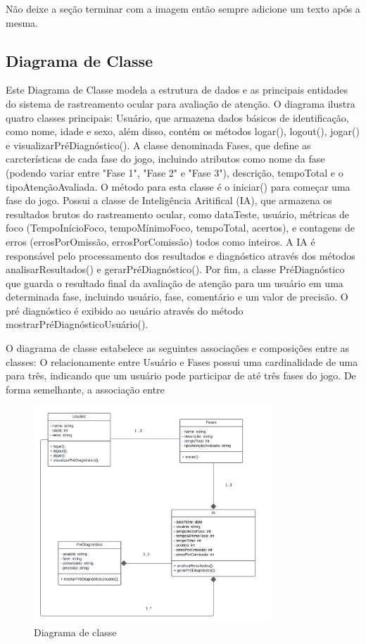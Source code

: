 \documentclass[
  a4paper,%
  12pt,%
  english,%
  brazilian,%
]{article}
\begin{document}
    Não deixe a seção terminar com a imagem então sempre adicione um texto após a mesma.
    
    \subsection*{Diagrama de Classe}

    Este Diagrama de Classe modela a estrutura de dados e as principais entidades do sistema de rastreamento ocular para avaliação de atenção.
    O diagrama ilustra quatro classes principais: Usuário, que armazena dados básicos de identificação, como nome, idade e sexo, além disso, contém os métodos logar(), logout(), jogar() e visualizarPréDiagnóstico(). A classe denominada Fases, que define as carcterísticas de cada fase do jogo, incluindo atributos como nome da fase (podendo variar entre "Fase 1", "Fase 2" e "Fase 3"), descrição, tempoTotal e o tipoAtençãoAvaliada. O método para esta classe é o iniciar() para começar uma fase do jogo. Possui a classe de Inteligência Aritifical (IA), que armazena os resultados brutos do rastreamento ocular, como dataTeste, usuário, métricas de foco (TempoInícioFoco, tempoMínimoFoco, tempoTotal, acertos), e contagens de erros (errosPorOmissão, errosPorComissão) todos como inteiros. A IA é responsável pelo processamento dos resultados e diagnóstico através dos métodos analisarResultados() e gerarPréDiagnóstico(). Por fim, a classe PréDiagnóstico que guarda o resultado final da avaliação de atenção para um usuário em uma determinada fase, incluindo usuário, fase, comentário e um valor de precisão. O pré diagnóstico é exibido ao usuário através do método mostrarPréDiagnósticoUsuário().

    O diagrama de classe estabelece as seguintes associações e composições entre as classes: O relacionamente entre Usuário e Fases possui uma cardinalidade de uma para três, indicando que um usuário pode participar de até três fases do jogo. De forma semelhante, a associação entre 

    \begin{figure}[H]
\centering
\caption{Diagrama de classe}%
\label{fig:diagrama-de-classe}
\includegraphics[width=0.8\textwidth]{Logos/diagrama-de-classe.png}
\end{figure}
\end{document}
